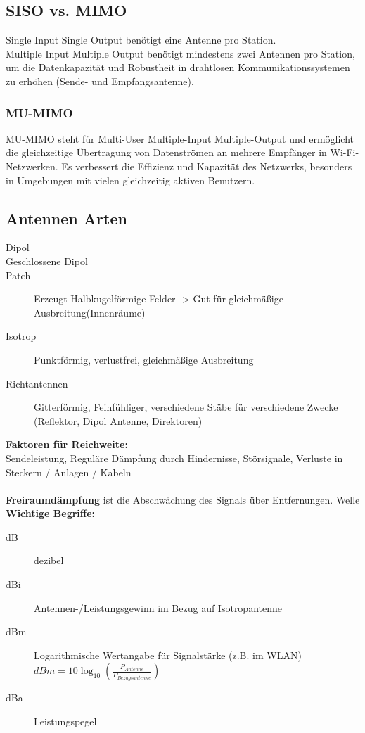 \documentclass[12pt,a4paper]{article}
\begin{document}
	\subsection{SISO vs. MIMO}
		Single Input Single Output benötigt eine Antenne pro Station.\\
		Multiple Input Multiple Output benötigt mindestens zwei Antennen pro Station, um die Datenkapazität und Robustheit in drahtlosen Kommunikationssystemen zu erhöhen (Sende- und Empfangsantenne).

		\subsubsection{MU-MIMO}
		MU-MIMO steht für Multi-User Multiple-Input Multiple-Output und ermöglicht die gleichzeitige Übertragung von Datenströmen an mehrere Empfänger in Wi-Fi-Netzwerken. Es verbessert die Effizienz und Kapazität des Netzwerks, besonders in Umgebungen mit vielen gleichzeitig aktiven Benutzern.

	\subsection{Antennen Arten}
	\begin{description}
		\item[Dipol] 
		\item[Geschlossene Dipol]
		\item[Patch] Erzeugt Halbkugelförmige Felder -> Gut für gleichmäßige Ausbreitung(Innenräume)
		\item[Isotrop] Punktförmig, verlustfrei, gleichmäßige Ausbreitung
		\item[Richtantennen] Gitterförmig, Feinfühliger, verschiedene Stäbe für verschiedene Zwecke (Reflektor, Dipol Antenne, Direktoren)
	\end{description}
	\textbf{Faktoren für Reichweite:}\\
	Sendeleistung, Reguläre Dämpfung durch Hindernisse, Störsignale, Verluste in Steckern / Anlagen / Kabeln \\\\
	\textbf{Freiraumdämpfung} ist die Abschwächung des Signals über Entfernungen. Welle 
	\textbf{Wichtige Begriffe:}
	\begin{description}
		\item[dB] dezibel
		\item[dBi] Antennen-/Leistungsgewinn im Bezug auf Isotropantenne
		\item[dBm] Logarithmische Wertangabe für Signalstärke (z.B. im WLAN)\\
		$dBm = 10 \log _{10} (\frac{P_{Antenne}}{P_{Bezugsantenne}})$
		\item[dBa] Leistungspegel
	\end{description}
\end{document}
